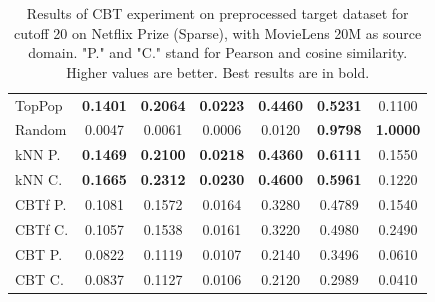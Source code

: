 \begin{table}[hbt]
\begin{tabulary}{\textwidth}{|L|CCCCCC|}
\hline
TopPop & \textbf{0.1401} & \textbf{0.2064} & \textbf{0.0223} & \textbf{0.4460} & \textbf{0.5231} & 0.1100 \\
Random & 0.0047 & 0.0061 & 0.0006 & 0.0120 & \textbf{0.9798} & \textbf{1.0000} \\
kNN P. & \textbf{0.1469} & \textbf{0.2100} & \textbf{0.0218} & \textbf{0.4360} & \textbf{0.6111} & 0.1550 \\
kNN C. & \textbf{0.1665} & \textbf{0.2312} & \textbf{0.0230} & \textbf{0.4600} & \textbf{0.5961} & 0.1220 \\
CBTf P. & 0.1081 & 0.1572 & 0.0164 & 0.3280 & 0.4789 & 0.1540 \\
CBTf C. & 0.1057 & 0.1538 & 0.0161 & 0.3220 & 0.4980 & 0.2490 \\
CBT P. & 0.0822 & 0.1119 & 0.0107 & 0.2140 & 0.3496 & 0.0610 \\
CBT C. & 0.0837 & 0.1127 & 0.0106 & 0.2120 & 0.2989 & 0.0410 \\
\hline
\end{tabulary}
\caption{Results of CBT experiment on preprocessed target dataset for cutoff 20 on Netflix Prize (Sparse), with MovieLens 20M as source domain. "P." and "C." stand for Pearson and cosine similarity. Higher values are better. Best results are in bold.}
\end{table}


